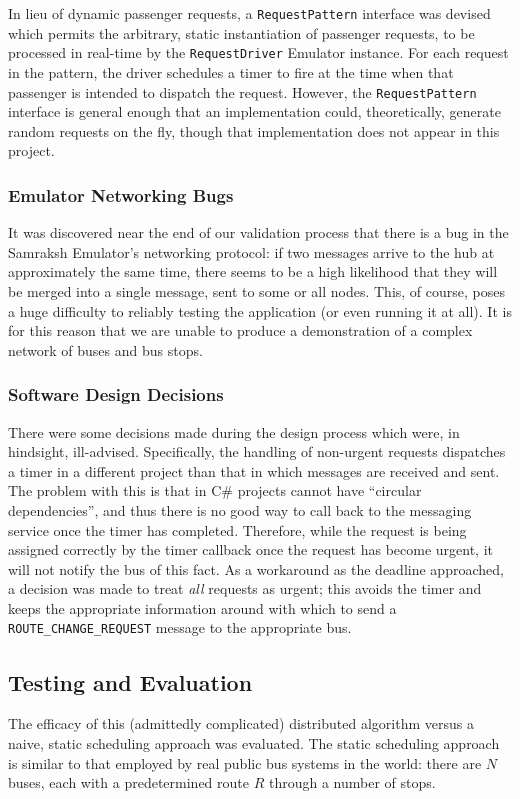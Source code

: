 \documentclass[runningheads]{llncs}
\begin{document}
In lieu of dynamic passenger requests, a \lstinline{RequestPattern} interface was devised which permits the arbitrary, static instantiation of passenger requests, to be processed in real-time by the \lstinline{RequestDriver} Emulator instance. For each request in the pattern, the driver schedules a timer to fire at the time when that passenger is intended to dispatch the request. However, the \lstinline{RequestPattern} interface is general enough that an implementation could, theoretically, generate random requests on the fly, though that implementation does not appear in this project.

\subsubsection{Emulator Networking Bugs}
It was discovered near the end of our validation process that there is a bug in the Samraksh Emulator's networking protocol: if two messages arrive to the hub at approximately the same time, there seems to be a high likelihood that they will be merged into a single message, sent to some or all nodes. This, of course, poses a huge difficulty to reliably testing the application (or even running it at all). It is for this reason that we are unable to produce a demonstration of a complex network of buses and bus stops.

\subsubsection{Software Design Decisions}
There were some decisions made during the design process which were, in hindsight, ill-advised. Specifically, the handling of non-urgent requests dispatches a timer in a different project than that in which messages are received and sent. The problem with this is that in C\# projects cannot have ``circular dependencies'', and thus there is no good way to call back to the messaging service once the timer has completed. Therefore, while the request is being assigned correctly by the timer callback once the request has become urgent, it will not notify the bus of this fact. As a workaround as the deadline approached, a decision was made to treat \emph{all} requests as urgent; this avoids the timer and keeps the appropriate information around with which to send a \lstinline{ROUTE_CHANGE_REQUEST} message to the appropriate bus.

\subsection{Testing and Evaluation}
The efficacy of this (admittedly complicated) distributed algorithm versus a naive, static scheduling approach was evaluated. The static scheduling approach is similar to that employed by real public bus systems in the world: there are $N$ buses, each with a predetermined route $R$ through a number of stops.
\end{document}
